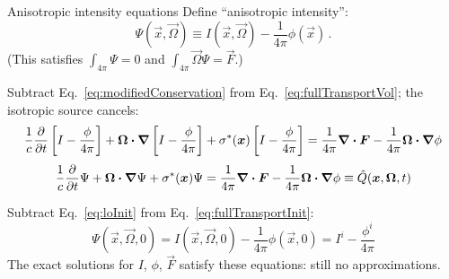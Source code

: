 \documentclass{beamer}
\begin{document}
\begin{frame}{Anisotropic intensity equations}
  Define ``anisotropic intensity'':
  \begin{equation} \label{eq:capPsi}
    \Psi(\vec{x}, \vec{\Omega}) \equiv I(\vec{x}, \vec{\Omega})
    - \frac{1}{4\pi} \phi(\vec{x})\,.
  \end{equation}
  (This satisfies $\int_{4\pi} \Psi=0$ and $\int_{4\pi} \vec{\Omega} \Psi =
  \vec{F}$.)

  Subtract Eq.~\eqref{eq:modifiedConservation} from
  Eq.~\eqref{eq:fullTransportVol}; the isotropic source cancels:
\begin{multline*}
  \frac{1}{c} \frac{\partial }{\partial t} \left[ I - \frac{\phi}{4\pi} \right]
    + \bm{\Omega}\bm{\cdot} \bm{\nabla} \left[ I - \frac{\phi}{4\pi} \right]
    + \sigma^\ast(\bm{x})\left[ I - \frac{\phi}{4\pi} \right]
  = \frac{1}{4\pi} \bm{\nabla} \bm{\cdot}\bm{F} -
  \frac{1}{4\pi} \bm{\Omega}\bm{\cdot} \bm{\nabla} \phi
\end{multline*}
\begin{equation*}
  \frac{1}{c} \frac{\partial }{\partial t} \Psi
   + \bm{\Omega}\bm{\cdot} \bm{\nabla} \Psi
   + \sigma^\ast(\bm{x}) \Psi
  = \frac{1}{4\pi} \bm{\nabla} \bm{\cdot}\bm{F} -
  \frac{1}{4\pi} \bm{\Omega}\bm{\cdot} \bm{\nabla} \phi
  \equiv \hat Q(\bm{x}, \bm{\Omega}, t)
\end{equation*}

  Subtract Eq.~\eqref{eq:loInit} from Eq.~\eqref{eq:fullTransportInit}:
  \begin{equation*}
    \Psi(\vec{x}, \vec{\Omega}, 0) =
    I(\vec{x}, \vec{\Omega}, 0) - \frac{1}{4\pi}\phi(\vec{x}, 0)
    = I^i - \frac{\phi^i}{4\pi}
  \end{equation*}
  The exact solutions for $I$, $\phi$, $\vec{F}$ satisfy these equations: still
  no approximations.
\end{frame}
\end{document}
